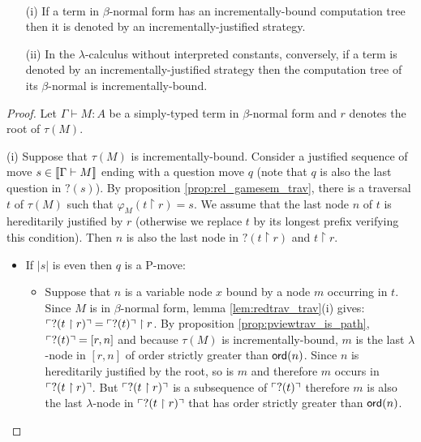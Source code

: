 \begin{prop} \
\label{prop:incrbound_imp_incrjustified}
\begin{enumerate}
\item[(i)] If a term in $\beta$-normal form has an incrementally-bound computation tree then it is denoted by an incrementally-justified strategy.
\item[(ii)] In the $\lambda$-calculus without interpreted constants, conversely, if a term is denoted by an incrementally-justified strategy then
the computation tree of its $\beta$-normal is incrementally-bound.
\end{enumerate}
\end{prop}

\begin{proof}
Let $\Gamma \vdash M : A$ be a simply-typed term in $\beta$-normal
form and $r$ denotes the root of $\tau(M)$.

\noindent (i) Suppose that $\tau(M)$ is incrementally-bound.
Consider a justified sequence of move $s \in {[\![\Gamma \vdash M ]\!]}$
ending with a question move $q$ (note that $q$ is also the last
question in $?(s)$). By proposition \ref{prop:rel_gamesem_trav},
there is a traversal $t$ of $\tau(M)$ such that $\varphi_{M}(t
\upharpoonright r) = s$. We assume that the last node $n$ of $t$ is
hereditarily justified by $r$ (otherwise we replace $t$ by its
longest prefix verifying this condition). Then $n$ is also the last
node in $?(t \upharpoonright r)$ and $t \upharpoonright r$.

\begin{itemize}
\item If $|s|$ is even then $q$ is a P-move:
\begin{itemize}
\item Suppose that $n$ is a variable node $x$ bound by a node $m$ occurring in $t$.
Since $M$ is in $\beta$-normal form, lemma \ref{lem:redtrav_trav}(i)
gives: $ \ulcorner ?(t \upharpoonright r) \urcorner = \ulcorner ?(t) \urcorner
\upharpoonright  r$. By proposition \ref{prop:pviewtrav_is_path},
$\ulcorner ?(t) \urcorner = [r,n]$ and because $\tau(M)$ is incrementally-bound,
$m$ is the last $\lambda$-node in $[r,n]$ of order strictly greater
than ${\sf ord}(n)$. Since $n$ is hereditarily justified by the root, so
is $m$ and therefore $m$ occurs in $\ulcorner ?(t \upharpoonright r) \urcorner$.
But $\ulcorner ?(t \upharpoonright r) \urcorner$ is a subsequence of
$\ulcorner ?(t) \urcorner$ therefore $m$ is also the last $\lambda$-node in
$\ulcorner ?(t \upharpoonright  r) \urcorner$ that has order strictly greater
than ${\sf ord}(n)$.


\end{itemize}
\end{itemize}
\end{proof}
